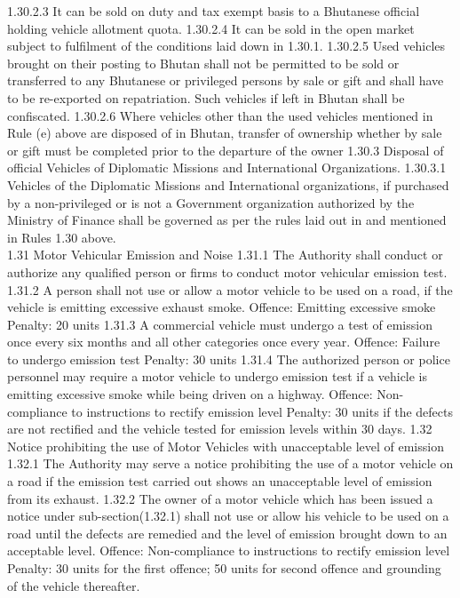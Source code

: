\documentclass[
]{book}
\begin{document}
1.30.2.3 It can be sold on duty and tax exempt basis to a Bhutanese official holding vehicle allotment quota.
1.30.2.4 It can be sold in the open market subject to fulfilment of the conditions laid down in 1.30.1.
1.30.2.5 Used vehicles brought on their posting to Bhutan shall not be permitted to be sold or transferred to any Bhutanese or privileged persons by sale or gift and shall have to be re-exported on repatriation. Such vehicles if left in Bhutan shall be confiscated.
1.30.2.6 Where vehicles other than the used vehicles mentioned in Rule (e) above are disposed of in Bhutan, transfer of ownership whether by sale or gift must be completed prior to the departure of the owner
1.30.3 Disposal of official Vehicles of Diplomatic Missions and International Organizations.
1.30.3.1 Vehicles of the Diplomatic Missions and International organizations, if purchased by a non-privileged or is not a Government organization authorized by the Ministry of Finance shall be governed as per the rules laid out in and mentioned in Rules 1.30 above.\\
1.31 Motor Vehicular Emission and Noise
1.31.1 The Authority shall conduct or authorize any qualified person or firms to conduct motor vehicular emission test.
1.31.2 A person shall not use or allow a motor vehicle to be used on a road, if the vehicle is emitting excessive exhaust smoke.
Offence: Emitting excessive smoke
Penalty: 20 units
1.31.3 A commercial vehicle must undergo a test of emission once every six months and all other categories once every year.
Offence: Failure to undergo emission test
Penalty: 30 units
1.31.4 The authorized person or police personnel may require a motor vehicle to undergo emission test if a vehicle is emitting excessive smoke while being driven on a highway.
Offence: Non-compliance to instructions to rectify emission level
Penalty: 30 units if the defects are not rectified and the vehicle tested for emission levels within 30 days.
1.32 Notice prohibiting the use of Motor Vehicles with unacceptable level of emission
1.32.1 The Authority may serve a notice prohibiting the use of a motor vehicle on a road if the emission test carried out shows an unacceptable level of emission from its exhaust.
1.32.2 The owner of a motor vehicle which has been issued a notice under sub-section(1.32.1) shall not use or allow his vehicle to be used on a road until the defects are remedied and the level of emission brought down to an acceptable level.
Offence: Non-compliance to instructions to rectify emission level
Penalty: 30 units for the first offence; 50 units for second offence and grounding of the vehicle thereafter.
\end{document}

